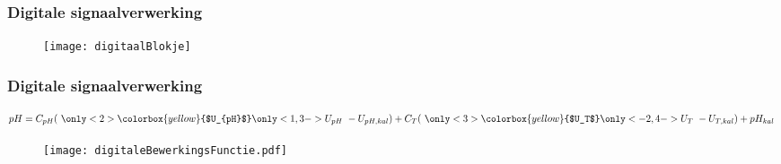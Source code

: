 
\begin{frame}
    \frametitle{Digitale signaalverwerking}

    \begin{figure}
        \centering
        \texttt{[image: digitaalBlokje]}
    \end{figure}

\end{frame}

\begin{frame}
    \frametitle{Digitale signaalverwerking}

    \begin{equation}\label{eq:digitaleBS}
        pH = C_{pH}(\
            \only<2>{\colorbox{yellow}{$U_{pH}$}}\only<1,3->{U_{pH}}\
        - U_{pH,kal}) + C_T(\
            \only<3>{\colorbox{yellow}{$U_T$}}\only<-2,4->{U_T}\
        - U_{T,kal}) + pH_{kal}\
    \end{equation}
    

    \pause[4]
    
    \begin{figure}
        \centering
        \texttt{[image: digitaleBewerkingsFunctie.pdf]}
    \end{figure}



\end{frame}